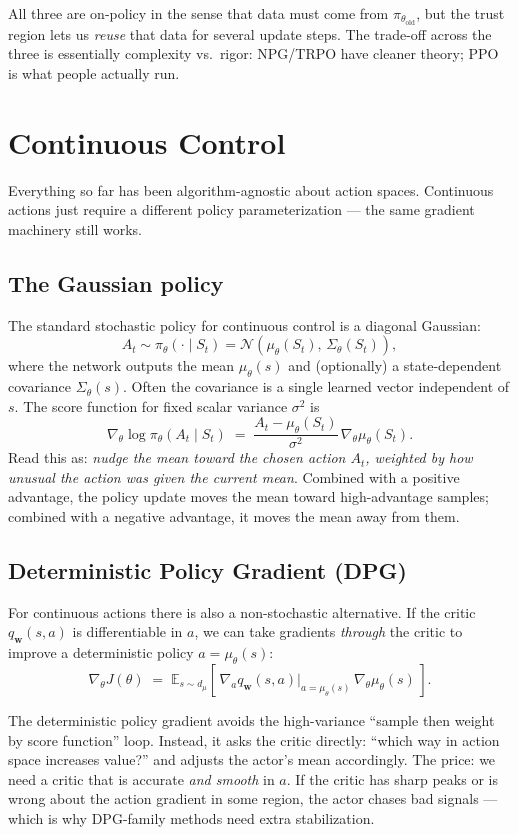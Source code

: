 \documentclass[11pt, oneside]{book}
\newcommand{\E}{\mathbb{E}}              %
\newcommand{\Normal}{\mathcal{N}}
\begin{document}
All three are on-policy in the sense that data must come from $\pi_{\theta_{\text{old}}}$,
but the trust region lets us \emph{reuse} that data for several update steps.
The trade-off across the three is essentially complexity vs.\ rigor: NPG/TRPO have
cleaner theory; PPO is what people actually run.

\section{Continuous Control}

Everything so far has been algorithm-agnostic about action spaces.
Continuous actions just require a different policy parameterization --- the same
gradient machinery still works.

\subsection{The Gaussian policy}

The standard stochastic policy for continuous control is a diagonal Gaussian:
\[
  A_t \sim \pi_\theta(\cdot \mid S_t) = \Normal(\mu_\theta(S_t),\, \Sigma_\theta(S_t)),
\]
where the network outputs the mean $\mu_\theta(s)$ and (optionally) a state-dependent
covariance $\Sigma_\theta(s)$.
Often the covariance is a single learned vector independent of $s$.
The score function for fixed scalar variance $\sigma^2$ is
\[
  \nabla_\theta \log \pi_\theta(A_t \mid S_t) \;=\; \frac{A_t - \mu_\theta(S_t)}{\sigma^2}\, \nabla_\theta \mu_\theta(S_t).
\]
Read this as: \emph{nudge the mean toward the chosen action $A_t$, weighted by how
unusual the action was given the current mean}.
Combined with a positive advantage, the policy update moves the mean toward
high-advantage samples; combined with a negative advantage, it moves the mean away
from them.

\subsection{Deterministic Policy Gradient (DPG)}

For continuous actions there is also a non-stochastic alternative.
If the critic $q_\mathbf{w}(s,a)$ is differentiable in $a$, we can take gradients
\emph{through} the critic to improve a deterministic policy $a = \mu_\theta(s)$:
\[
  \nabla_\theta J(\theta)
  \;=\; \E_{s \sim d_\mu}\!\left[\, \nabla_a q_\mathbf{w}(s,a)\big|_{a = \mu_\theta(s)}\, \nabla_\theta \mu_\theta(s)\, \right].
\]

\begin{intbox}
The deterministic policy gradient avoids the high-variance ``sample then weight by
score function'' loop.
Instead, it asks the critic directly: ``which way in action space increases value?''
and adjusts the actor's mean accordingly.
The price: we need a critic that is accurate \emph{and smooth} in $a$. If the critic
has sharp peaks or is wrong about the action gradient in some region, the actor
chases bad signals --- which is why DPG-family methods need extra stabilization.
\end{intbox}
\end{document}
